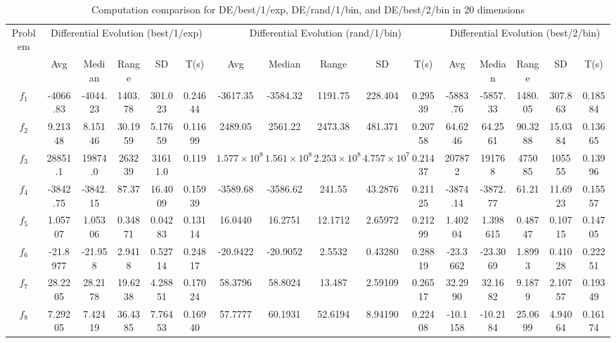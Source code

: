 \documentclass[paper=a4, fontsize=11pt]{scrartcl} %
\numberwithin{equation}{section} %
\numberwithin{figure}{section} %
\numberwithin{table}{section} %
\begin{document}
\pagebreak

\begin{landscape}
	\begin{table}
		\tiny
		\centering
		\caption{Computation comparison for DE/best/1/exp, DE/rand/1/bin, and DE/best/2/bin in 20 dimensions}
		\label{Tab1d}
		\begin{tabular}{c|ccccc|ccccc|ccccc}
			\noalign{\smallskip}\hline\noalign{\smallskip}
			Problem & \multicolumn{5}{c}{Differential Evolution (best/1/exp)}& \multicolumn{5}{|c|}{Differential Evolution (rand/1/bin)} &  \multicolumn{5}{c}{Differential Evolution (best/2/bin)} \\  
			\noalign{\smallskip}\hline\noalign{\smallskip}
			& Avg & Median & Range & SD & T(s) & Avg & Median
			& Range & SD & T(s) & Avg & Median & Range & SD &
			T(s) \\ 
			\noalign{\smallskip}\hline\noalign{\smallskip}
			$f_{1}$  & -4066.83 & -4044.23 & 1403.78 & 301.023 & 0.24644 & -3617.35 & -3584.32 & 1191.75 & 228.404 & 0.29539 & -5883.76 & -5857.33 & 1480.05 & 307.863 & 0.18584\\
			$f_{2}$  &  9.21348 &  8.15146 & 30.1959 & 5.17659 & 0.11699 &  2489.05 &  2561.22 & 2473.38 & 481.371 & 0.20758 &  64.6246 &  64.2561 & 90.3288 & 15.0384 & 0.13665\\
			$f_{3}$  &  28851.1 &  19874.0 & 263239  & 31611.0 & 0.119   &  $1.577\times 10^{8}$ & $1.561\times 10^{8}$ & $2.253\times 10^{8}$ & $4.757\times 10^{7}$ & 0.21437 & 207872 & 191768 & 475085 & 105555 & 0.13996\\
			$f_{4}$  & -3842.75 & -3842.15 & 87.37   & 16.4009 & 0.15939 & -3589.68 & -3586.62 & 241.55  & 43.2876 & 0.21125 & -3874.14 & -3872.77 & 61.21   & 11.6923 & 0.15557\\
			$f_{5}$  &  1.05707 &  1.05306 & 0.34871 & 0.04283 & 0.13114 &  16.0440 &  16.2751 & 12.1712 & 2.65972 & 0.21299 &  1.40204 & 1.398615 & 0.48747 & 0.10715 & 0.14705\\
			$f_{6}$  & -21.8977 & -21.958  & 2.9418  & 0.52714 & 0.24817 & -20.9422 & -20.9052 & 2.5532  & 0.43280 & 0.28819 & -23.3662 & -23.3069 & 1.8993  & 0.41028 & 0.22251\\
			$f_{7}$  &  28.2205 &  28.2178 & 19.6238 & 4.28851 & 0.17024 &  58.3796 &  58.8024 & 13.487  & 2.59109 & 0.26517 &  32.2990 &  32.1682 & 9.1879  & 2.10757 & 0.19349\\
			$f_{8}$  &  7.29205 &  7.42419 & 36.4385 & 7.76453 & 0.16940 &  57.7777 &  60.1931 & 52.6194 & 8.94190 & 0.22408 & -10.1158 & -10.2184 & 25.0699 & 4.94064 & 0.16174\\

\end{tabular}
\end{table}
\end{landscape}
\end{document}
